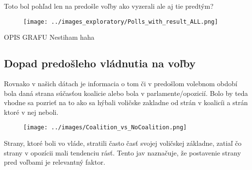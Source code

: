 \documentclass[main.tex]{subfiles}
\begin{document}
Toto bol pohľad len na predošle voľby ako vyzerali ale aj tie predtým?

\begin{figure}[h]
    \centering
    \texttt{[image: ../images\_exploratory/Polls\_with\_result\_ALL.png]}
    \caption{}
    \label{fig:example}
\end{figure}

OPIS GRAFU Nestiham haha

\subsection{Dopad predošleho vládnutia na voľby}

Rovnako v našich dátach je informacia o tom či v predošlom volebnom období bola daná strana súčasťou koalicie alebo bola v parlamente/opozicií. Bolo by teda vhodne sa pozrieť na to ako sa hýbali voličske zakladne od strán v koalicíi a strán ktoré v nej neboli. 
\begin{figure}[h]
    \centering
    \texttt{[image: ../images/Coalition\_vs\_NoCoalition.png]}
    \caption{}
    \label{fig:example}
\end{figure}
Strany, ktoré boli vo vláde, stratili často časť svojej voličskej základne, zatiaľ čo strany v opozícii mali tendenciu rásť. Tento jav naznačuje, že postavenie strany pred voľbami je relevantný faktor.
\end{document}
